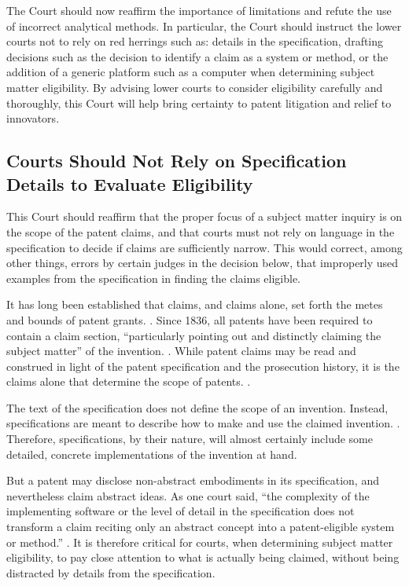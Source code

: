 \documentclass{scotus}
\begin{document}
The Court should now reaffirm the importance of  limitations and
refute the use of incorrect analytical methods. In particular, the Court should
instruct the lower courts not to rely on red herrings such as: details in the
specification, drafting decisions such as the decision to identify a claim as a
system or method, or the addition of a generic platform such as a computer when
determining subject matter eligibility. By advising lower courts to consider
eligibility carefully and thoroughly, this Court will help bring certainty to
patent litigation and relief to innovators. 


%
%
\subsection{Courts Should Not Rely on
Specification Details to Evaluate Eligibility}

This Court should reaffirm that the proper focus of a  subject
matter inquiry is on the scope of the patent claims, and that courts must not
rely on language in the specification to decide if claims are sufficiently
narrow. This would correct, among other things, errors by certain judges in the
decision below, that improperly used examples from the specification in finding
the claims eligible.

It has long been established that claims, and claims alone, set forth the metes
and bounds of patent grants. . Since 1836, all patents
have been required to contain a claim section, ``particularly pointing out and
distinctly claiming the subject matter'' of the invention. .
While patent claims may be read and construed in light of the patent
specification and the prosecution history, it is the claims alone that determine
the scope of patents. .
        
The text of the specification does not define the scope of an invention.
Instead, specifications are meant to describe how to make and use the claimed
invention. . Therefore, specifications, by their nature,
will almost certainly include some detailed, concrete implementations of the
invention at hand.

But a patent may disclose non-abstract embodiments in its specification, and
nevertheless claim abstract ideas. As one court said, ``the complexity of the
implementing software or the level of detail in the specification does not
transform a claim reciting only an abstract concept into a patent-eligible
system or method.'' . It is therefore critical for courts,
when determining subject matter eligibility, to pay close
attention to what is actually being claimed, without being distracted by details
from the specification.
\end{document}
